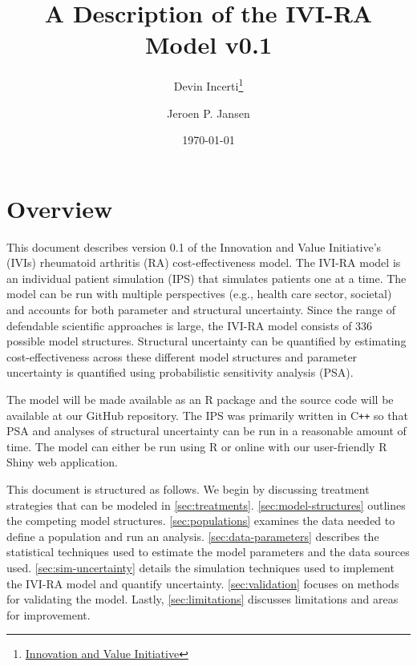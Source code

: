 \documentclass[11pt,final,fleqn]{article}\usepackage[]{graphicx}\usepackage[]{color}
\title{A Description of the IVI-RA Model v0.1}
\author{Devin Incerti\footnote{\href{http://www.thevalueinitiative.org/}{Innovation and Value Initiative}} \and Jeroen P. Jansen\sameaff}
\date{\today}
\theoremstyle{plain}
\newcommand\CPP{{C\texttt{++}}}
\newcommand\R{{\textsf{R}}}
\begin{document}
\maketitle

\begingroup
 \hypersetup{linkcolor=black} \tableofcontents
 \listoffigures
 \listoftables
\endgroup



\section{Overview}\label{overview}

This document describes version 0.1 of the Innovation and Value Initiative's (IVIs) rheumatoid arthritis (RA) cost-effectiveness model. The IVI-RA model is an individual patient simulation (IPS) that simulates patients one at a time. The model can be run with multiple perspectives (e.g., health care sector, societal) and accounts for both parameter and structural uncertainty. Since the range of defendable scientific approaches is large, the IVI-RA model consists of 336 possible model structures. Structural uncertainty can be quantified by estimating cost-effectiveness across these different model structures and parameter uncertainty is quantified using probabilistic sensitivity analysis (PSA). 


The model will be made available as an \R{} package and the source code will be available at our GitHub repository. The IPS was primarily written in \CPP{} so that PSA and analyses of structural uncertainty can be run in a reasonable amount of time. The model can either be run using \R{} or online with our user-friendly R Shiny web application. 

This document is structured as follows. We begin by discussing treatment strategies that can be modeled in \autoref{sec:treatments}. \autoref{sec:model-structures} outlines the competing model structures. \autoref{sec:populations} examines the data needed to define a population and run an analysis. \autoref{sec:data-parameters} describes the statistical techniques used to estimate the model parameters and the data sources used. \autoref{sec:sim-uncertainty} details the simulation techniques used to implement the IVI-RA model and quantify uncertainty. \autoref{sec:validation} focuses on methods for validating the model. Lastly, \autoref{sec:limitations} discusses limitations and areas for improvement. 
\end{document}

